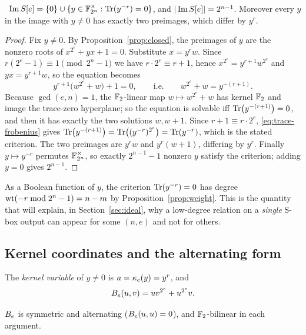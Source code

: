 \begin{proposition}[image]\label{prop:image}
\Proved\ $\operatorname{Im}S[e]=\{0\}\cup\{y\in\mathbb{F}_{2^n}^\times:\operatorname{Tr}(y^{-r})=0\}$, and
$|\operatorname{Im}S[e]|=2^{n-1}$. Moreover every $y$ in the image with $y\neq 0$ has exactly two
preimages, which differ by $y^{r}$.
\end{proposition}
\begin{proof}
Fix $y\ne0$. By Proposition~\ref{prop:closed}, the preimages of $y$ are the nonzero roots of
$x^{2^e}+yx+1=0$. Substitute $x=y^{r}w$. Since $r(2^e-1)\equiv1 \pmod{2^n-1}$ we have
$r\cdot2^e\equiv r+1$, hence $x^{2^e}=y^{r+1}w^{2^e}$ and $yx=y^{r+1}w$, so the equation becomes
\[
  y^{r+1}\bigl(w^{2^e}+w\bigr)+1=0,\qquad\text{i.e.}\qquad w^{2^e}+w=y^{-(r+1)} .
\]
Because $\gcd(e,n)=1$, the $\mathbb{F}_2$-linear map $w\mapsto w^{2^e}+w$ has kernel $\mathbb{F}_2$ and image the
trace-zero hyperplane; so the equation is solvable iff $\operatorname{Tr}\bigl(y^{-(r+1)}\bigr)=0$, and then it has
exactly the two solutions $w,w+1$. Since $r+1\equiv r\cdot 2^e$, \eqref{eq:trace-frobenius} gives
$\operatorname{Tr}\bigl(y^{-(r+1)}\bigr)=\operatorname{Tr}\bigl((y^{-r})^{2^e}\bigr)=\operatorname{Tr}(y^{-r})$, which is the stated criterion.
The two preimages are $y^{r}w$ and $y^{r}(w+1)$, differing by $y^{r}$. Finally $y\mapsto y^{-r}$
permutes $\mathbb{F}_{2^n}^\times$, so exactly $2^{n-1}-1$ nonzero $y$ satisfy the criterion; adding $y=0$ gives
$2^{n-1}$.
\end{proof}

\begin{remark}\label{rem:image-degree}
As a Boolean function of $y$, the criterion $\operatorname{Tr}(y^{-r})=0$ has degree $\operatorname{wt}(-r\bmod 2^n-1)=n-m$ by
Proposition~\ref{prop:weight}. This is the quantity that will explain, in
Section~\ref{sec:ideal}, why a low-degree relation on a \emph{single} S-box output can appear for
some $(n,e)$ and not for others.
\end{remark}

\subsection{Kernel coordinates and the alternating form}

\begin{definition}\label{def:kernel}
The \emph{kernel variable} of $y\ne0$ is $a=\kappa_e(y)=y^{r}$, and
\[
  B_e(u,v)=uv^{2^e}+u^{2^e}v .
\]
\end{definition}

$B_e$ is symmetric and alternating ($B_e(u,u)=0$), and $\mathbb{F}_2$-bilinear in each argument.

